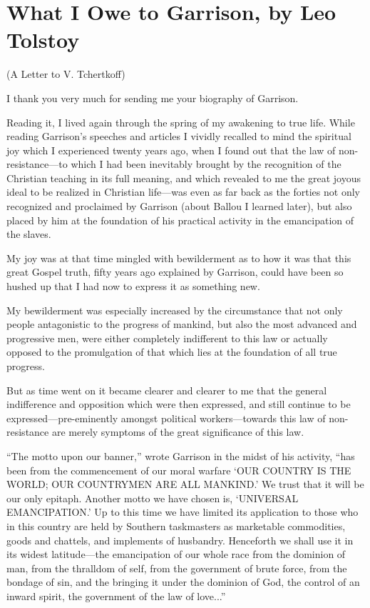 \documentclass{book}
\begin{document}
\chapter{What I Owe to Garrison, by Leo Tolstoy}
\label{chapter-4}
(A Letter to V. Tchertkoff)\footnotemark[1]

I thank you very much for sending me your biography of Garrison.

Reading it, I lived again through the spring of my awakening to true life. While reading Garrison’s speeches and articles I vividly recalled to mind the spiritual joy which I experienced twenty years ago, when I found out that the law of non-resistance—to which I had been inevitably brought by the recognition of the Christian teaching in its full meaning, and which revealed to me the great joyous ideal to be realized in Christian life—was even as far back as the forties not only recognized and proclaimed by Garrison (about Ballou I learned later), but also placed by him at the foundation of his practical activity in the emancipation of the slaves.

My joy was at that time mingled with bewilderment as to how it was that this great Gospel truth, fifty years ago explained by Garrison, could have been so hushed up that I had now to express it as something new.

My bewilderment was especially increased by the circumstance that not only people antagonistic to the progress of mankind, but also the most advanced and progressive men, were either completely indifferent to this law or actually opposed to the promulgation of that which lies at the foundation of all true progress.

But as time went on it became clearer and clearer to me that the general indifference and opposition which were then expressed, and still continue to be expressed—pre-eminently amongst political workers—towards this law of non-resistance are merely symptoms of the great significance of this law.

“The motto upon our banner,” wrote Garrison in the midst of his activity, “has been from the commencement of our moral warfare ‘OUR COUNTRY IS THE WORLD; OUR COUNTRYMEN ARE ALL MANKIND.’ We trust that it will be our only epitaph. Another motto we have chosen is, ‘UNIVERSAL EMANCIPATION.’ Up to this time we have limited its application to those who in this country are held by Southern taskmasters as marketable commodities, goods and chattels, and implements of husbandry. Henceforth we shall use it in its widest latitude—the emancipation of our whole race from the dominion of man, from the thralldom of self, from the government of brute force, from the bondage of sin, and the bringing it under the dominion of God, the control of an inward spirit, the government of the law of love...”
\end{document}
